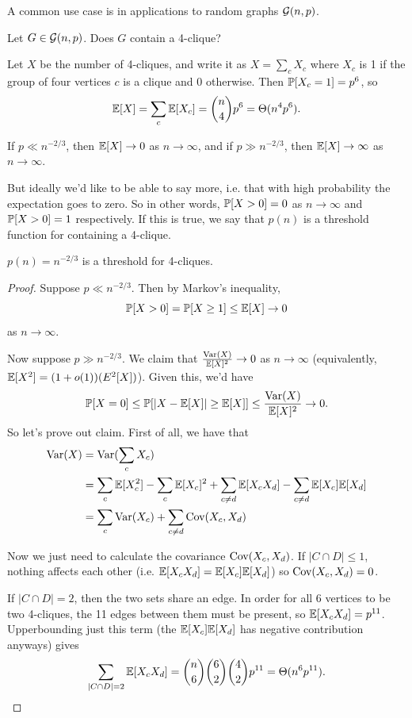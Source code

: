 \documentclass[11 pt]{scrartcl}
\begin{document}
    A common use case is in applications to random graphs $\mathcal G(n,p)$. 
\begin{example}
    Let $G \in \mathcal G(n,p)$. Does $G$ contain a 4-clique? 

    Let $X$ be the number of 4-cliques, and write it as $X = \sum_c X_c$ where $X_c$ is 1 if the group of four vertices $c$ is a clique and 0 otherwise. Then $\mathbb P[X_c = 1] = p^6$, so 
    \[ \mathbb E[X] = \sum_c \mathbb E[X_c] = \binom{n}{4} p^6 = \Theta(n^4p^6).\] 

    If $p \ll n^{-2/3}$, then $\mathbb E[X] \to 0$ as $n\to \infty$, and if $p \gg n^{-2/3}$, then $\mathbb E[X] \to \infty$ as $n\to \infty$. 

    But ideally we'd like to be able to say more, i.e. that with high probability the expectation goes to zero. So in other words, $\mathbb P[X > 0] = 0$ as $n\to\infty$ and $\mathbb P[X > 0] = 1$ respectively. If this is true, we say that $p(n)$ is a threshold function for containing a 4-clique. 

    \begin{claim}
        $p(n) = n^{-2/3}$ is a threshold for 4-cliques. 
    \end{claim}
    \begin{proof}
        Suppose $p \ll n^{-2/3}$. Then by Markov's inequality, 
        \[ \mathbb P[X>0] = \mathbb P[X \geq 1] \leq \mathbb E[X] \to 0\] 
        as $n\to\infty$. 

        Now suppose $p \gg n^{-2/3}$. We claim that $\frac{\text{Var}(X)}{\mathbb E[X]^2} \to 0$ as $n\to \infty$ (equivalently, $\mathbb E[X^2] = (1 + o(1))(E^2[X])$). Given this, we'd have 
        \[ \mathbb P[X = 0] \leq \mathbb P[|X - \mathbb E[X]| \geq \mathbb E[X]] \leq \dfrac{\text{Var}(X)}{\mathbb E[X]^2} \to 0.\] 
        So let's prove out claim. First of all, we have that 
        \begin{align*}
            \text{Var}(X) &= \text{Var}(\sum_c X_c) \\ 
                    &= \sum_c \mathbb E[X_c^2] - \sum_c \mathbb E[X_c]^2 + \sum_{c\not= d} \mathbb E[X_cX_d] - \sum_{c\not= d}\mathbb E[X_c]\mathbb E[X_d] \\ 
                    &= \sum_c \text{Var}(X_c) + \sum_{c\not= d} \text{Cov}(X_c, X_d) \\ 
        \end{align*}

        Now we just need to calculate the covariance $\text{Cov}(X_c, X_d)$. If $|C \cap D| \leq 1$, nothing affects each other (i.e. $\mathbb E[X_cX_d] = \mathbb E[X_c]\mathbb E[X_d]$) so $\text{Cov}(X_c,X_d) = 0$. 

        If $|C\cap D| = 2$, then the two sets share an edge. In order for all 6 vertices to be two 4-cliques, the 11 edges between them must be present, so $\mathbb E[X_cX_d] = p^{11}$. Upperbounding just this term (the $\mathbb E[X_c]\mathbb E[X_d]$ has negative contribution anyways) gives 
        \[ \sum_{|C\cap D| = 2} \mathbb E[X_cX_d] = \dbinom{n}{6} \dbinom{6}{2}\dbinom{4}{2} p^{11} = \Theta(n^6p^{11}).\] 


\end{proof}
\end{example}
\end{document}

